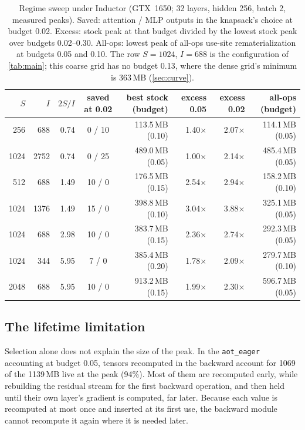 \documentclass[10pt]{article}
\newcommand{\code}[1]{\texttt{#1}}
\begin{document}
\begin{table}[t]
\centering
\caption{Regime sweep under Inductor (GTX~1650; 32 layers, hidden 256, batch 2, measured peaks). Saved: attention / MLP
outputs in the knapsack's choice at budget 0.02. Excess: stock peak at that budget divided by the lowest stock peak over
budgets 0.02--0.30. All-ops: lowest peak of all-ops use-site rematerialization at budgets 0.05 and 0.10. The row
$S=1024$, $I=688$ is the configuration of \cref{tab:main}; this coarse grid has no budget 0.13, where the dense grid's
minimum is 363\,MB (\cref{sec:curve}).}
\label{tab:regime}
\small
\begin{tabular}{rrrcrrrr}
\toprule
$S$ & $I$ & $2S/I$ & saved at 0.02 & best stock (budget) & excess 0.05 & excess 0.02 & all-ops (budget) \\
\midrule
256 & 688 & 0.74 & 0 / 10 & 113.5\,MB (0.10) & 1.40$\times$ & 2.07$\times$ & 114.1\,MB (0.05) \\
1024 & 2752 & 0.74 & 0 / 25 & 489.0\,MB (0.05) & 1.00$\times$ & 2.14$\times$ & 485.4\,MB (0.05) \\
512 & 688 & 1.49 & 10 / 0 & 176.5\,MB (0.15) & 2.54$\times$ & 2.94$\times$ & 158.2\,MB (0.10) \\
1024 & 1376 & 1.49 & 15 / 0 & 398.8\,MB (0.10) & 3.04$\times$ & 3.88$\times$ & 325.1\,MB (0.05) \\
1024 & 688 & 2.98 & 10 / 0 & 383.7\,MB (0.15) & 2.36$\times$ & 2.74$\times$ & 292.3\,MB (0.05) \\
1024 & 344 & 5.95 & 7 / 0 & 385.4\,MB (0.20) & 1.78$\times$ & 2.09$\times$ & 279.7\,MB (0.10) \\
2048 & 688 & 5.95 & 10 / 0 & 913.2\,MB (0.15) & 1.99$\times$ & 2.30$\times$ & 596.7\,MB (0.05) \\
\bottomrule
\end{tabular}
\end{table}

\subsection{The lifetime limitation}
Selection alone does not explain the size of the peak. In the \code{aot\_eager} accounting at budget 0.05, tensors
recomputed in the backward account for 1069 of the 1139\,MB live at the peak (94\%). Most of them are recomputed
early, while rebuilding the
residual stream for the first backward operation, and then held until their own layer's gradient is computed, far
later. Because each value is recomputed at most once and inserted at its first use, the backward module cannot
recompute it again where it is needed later.
\end{document}
